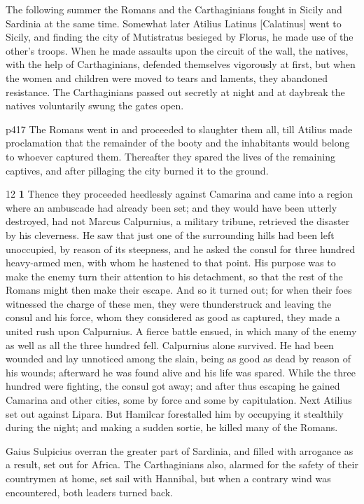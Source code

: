 The following summer the Romans and the Carthaginians fought in Sicily and Sardinia at the same time. Somewhat later Atilius Latinus [Calatinus] went to Sicily, and finding the city of Mutistratus besieged by Florus, he made use of the other's troops. When he made assaults upon the circuit of the wall, the natives, with the help of Carthaginians, defended themselves vigorously at first, but when the women and children were moved to tears and laments, they abandoned resistance. The Carthaginians passed out secretly at night and at daybreak the natives voluntarily swung the gates open.

p417 The Romans went in and proceeded to slaughter them all, till Atilius made proclamation that the remainder of the booty and the inhabitants would belong to whoever captured them. Thereafter they spared the lives of the remaining captives, and after pillaging the city burned it to the ground.

12
\textbf{1} Thence they proceeded heedlessly against Camarina and came into a region where an ambuscade had already been set; and they would have been utterly destroyed, had not Marcus Calpurnius, a military tribune, retrieved the disaster by his cleverness. He saw that just one of the surrounding hills had been left unoccupied, by reason of its steepness, and he asked the consul for three hundred heavy-armed men, with whom he hastened to that point. His purpose was to make the enemy turn their attention to his detachment, so that the rest of the Romans might then make their escape. And so it turned out; for when their foes witnessed the charge of these men, they were thunderstruck and leaving the consul and his force, whom they considered as good as captured, they made a united rush upon Calpurnius. A fierce battle ensued, in which many of the enemy as well as all the three hundred fell. Calpurnius alone survived. He had been wounded and lay unnoticed among the slain, being as good as dead by reason of his wounds; afterward he was found alive and his life was spared. While the three hundred were fighting, the consul got away; and after thus escaping he gained Camarina and other cities, some by force and some by capitulation. Next Atilius set out against Lipara. But Hamilcar forestalled him by occupying it stealthily during the night; and making a sudden sortie, he killed many of the Romans.

Gaius Sulpicius overran the greater part of Sardinia, and filled with arrogance as a result, set out for Africa. The Carthaginians also, alarmed for the safety of their countrymen at home, set sail with Hannibal, but when a contrary wind was encountered, both leaders turned back.

